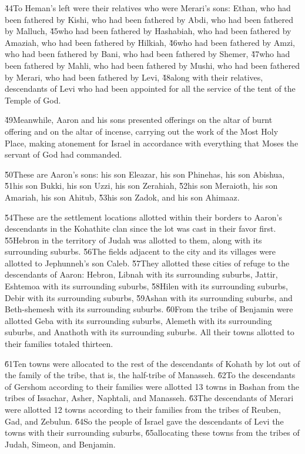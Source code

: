 \v{44}To Heman's left were their relatives who were Merari's sons: Ethan, who had been fathered by Kishi, who had been fathered by Abdi, who had been fathered by Malluch, \v{45}who had been fathered by Hashabiah, who had been fathered by Amaziah, who had been fathered by Hilkiah, \v{46}who had been fathered by Amzi, who had been fathered by Bani, who had been fathered by Shemer, \v{47}who had been fathered by Mahli, who had been fathered by Mushi, who had been fathered by Merari, who had been fathered by Levi, \v{48}along with their relatives, descendants of Levi who had been appointed for all the service of the tent of the Temple of God.

\v{49}Meanwhile, Aaron and his sons presented offerings on the altar of burnt offering and on the altar of incense, carrying out the work of the Most Holy Place, making atonement for Israel in accordance with everything that Moses the servant of God had commanded.

\v{50}These are Aaron's sons: his son Eleazar, his son Phinehas, his son Abishua, \v{51}his son Bukki, his son Uzzi, his son Zerahiah, \v{52}his son Meraioth, his son Amariah, his son Ahitub, \v{53}his son Zadok, and his son Ahimaaz.

\v{54}These are the settlement locations allotted within their borders to Aaron's descendants in the Kohathite clan since the lot was cast in their favor first. \v{55}Hebron in the territory of Judah was allotted to them, along with its surrounding suburbs. \v{56}The fields adjacent to the city and its villages were allotted to Jephunneh's son Caleb. \v{57}They allotted these cities of refuge to the descendants of Aaron: Hebron, Libnah with its surrounding suburbs, Jattir, Eshtemoa with its surrounding suburbs, \v{58}Hilen with its surrounding suburbs, Debir with its surrounding suburbs, \v{59}Ashan with its surrounding suburbs, and Beth-shemesh with its surrounding suburbs. \v{60}From the tribe of Benjamin were allotted Geba with its surrounding suburbs, Alemeth with its surrounding suburbs, and Anathoth with its surrounding suburbs. All their towns allotted to their families totaled thirteen.

\v{61}Ten towns were allocated to the rest of the descendants of Kohath by lot out of the family of the tribe, that is, the half-tribe of Manasseh. \v{62}To the descendants of Gershom according to their families were allotted 13 towns in Bashan from the tribes of Issachar, Asher, Naphtali, and Manasseh. \v{63}The descendants of Merari were allotted 12 towns according to their families from the tribes of Reuben, Gad, and Zebulun. \v{64}So the people of Israel gave the descendants of Levi the towns with their surrounding suburbs, \v{65}allocating these towns from the tribes of Judah, Simeon, and Benjamin.

